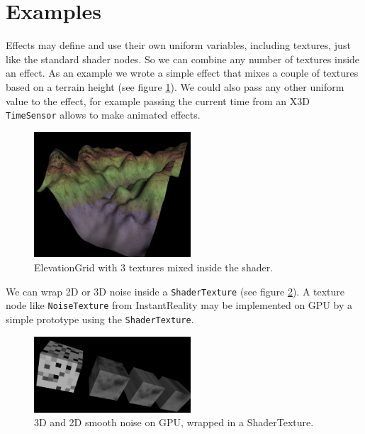 \documentclass{egpubl}
\begin{document}
\section{Examples}

Effects may define and use their own uniform variables, including textures,
just like the standard shader nodes. So we can combine any number of textures
inside an effect. As an example we wrote a simple effect that mixes a couple of
textures based on a terrain height (see figure \ref{fig_terrain}).
We could also pass any other uniform value to the effect, for example
passing the current time from an X3D \texttt{TimeSensor} allows to make
animated effects.

\begin{figure}[H]
  \centering
  \includegraphics[width=2.3in]{terrain}
  \caption{ElevationGrid with 3 textures mixed inside the shader.}
  \label{fig_terrain}
\end{figure}

We can wrap 2D or 3D noise inside a \texttt{ShaderTexture}
(see figure \ref{fig_noise}).
A texture node like \texttt{NoiseTexture} from InstantReality
\cite{instant:noisetex}
may be implemented on GPU by a simple prototype using the \texttt{ShaderTexture}.

\begin{figure}[H]
  \centering
  \includegraphics[width=2.3in]{noise-cropped}
  \caption{3D and 2D smooth noise on GPU, wrapped in a ShaderTexture.}
  \label{fig_noise}
\end{figure}
\end{document}
